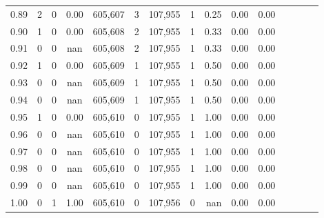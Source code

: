 \begin{tabular}{rrrcrrrrrrrrrrr}
0.89 &        2 &       0 &                                       0.00 &  605,607 &        3 &  107,955 &        1 &  0.25 &  0.00 &                         0.00 \\
0.90 &        1 &       0 &                                       0.00 &  605,608 &        2 &  107,955 &        1 &  0.33 &  0.00 &                         0.00 \\
0.91 &        0 &       0 &                                        nan &  605,608 &        2 &  107,955 &        1 &  0.33 &  0.00 &                         0.00 \\
0.92 &        1 &       0 &                                       0.00 &  605,609 &        1 &  107,955 &        1 &  0.50 &  0.00 &                         0.00 \\
0.93 &        0 &       0 &                                        nan &  605,609 &        1 &  107,955 &        1 &  0.50 &  0.00 &                         0.00 \\
0.94 &        0 &       0 &                                        nan &  605,609 &        1 &  107,955 &        1 &  0.50 &  0.00 &                         0.00 \\
0.95 &        1 &       0 &                                       0.00 &  605,610 &        0 &  107,955 &        1 &  1.00 &  0.00 &                         0.00 \\
0.96 &        0 &       0 &                                        nan &  605,610 &        0 &  107,955 &        1 &  1.00 &  0.00 &                         0.00 \\
0.97 &        0 &       0 &                                        nan &  605,610 &        0 &  107,955 &        1 &  1.00 &  0.00 &                         0.00 \\
0.98 &        0 &       0 &                                        nan &  605,610 &        0 &  107,955 &        1 &  1.00 &  0.00 &                         0.00 \\
0.99 &        0 &       0 &                                        nan &  605,610 &        0 &  107,955 &        1 &  1.00 &  0.00 &                         0.00 \\
1.00 &        0 &       1 &                                       1.00 &  605,610 &        0 &  107,956 &        0 &   nan &  0.00 &                         0.00 \\
\bottomrule
\end{tabular}
